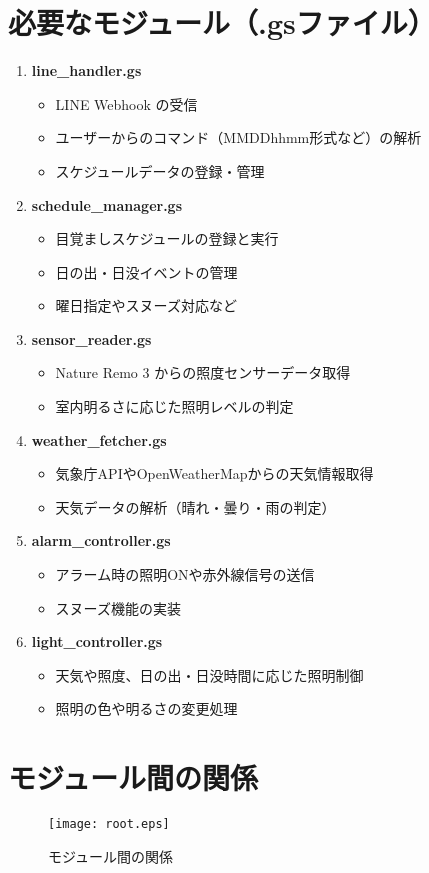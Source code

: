 \documentclass{jarticle}
\begin{document}
\section*{必要なモジュール（.gsファイル）}

\begin{enumerate}
  \item \textbf{line\_handler.gs}
  \begin{itemize}
    \item LINE Webhook の受信
    \item ユーザーからのコマンド（MMDDhhmm形式など）の解析
    \item スケジュールデータの登録・管理
  \end{itemize}

  \item \textbf{schedule\_manager.gs}
  \begin{itemize}
    \item 目覚ましスケジュールの登録と実行
    \item 日の出・日没イベントの管理
    \item 曜日指定やスヌーズ対応など
  \end{itemize}

  \item \textbf{sensor\_reader.gs}
  \begin{itemize}
    \item Nature Remo 3 からの照度センサーデータ取得
    \item 室内明るさに応じた照明レベルの判定
  \end{itemize}

  \item \textbf{weather\_fetcher.gs}
  \begin{itemize}
    \item 気象庁APIやOpenWeatherMapからの天気情報取得
    \item 天気データの解析（晴れ・曇り・雨の判定）
  \end{itemize}

  \item \textbf{alarm\_controller.gs}
  \begin{itemize}
    \item アラーム時の照明ONや赤外線信号の送信
    \item スヌーズ機能の実装
  \end{itemize}

  \item \textbf{light\_controller.gs}
  \begin{itemize}
    \item 天気や照度、日の出・日没時間に応じた照明制御
    \item 照明の色や明るさの変更処理
  \end{itemize}
\end{enumerate}

\section*{モジュール間の関係}

\begin{figure}[H]  %
  \begin{center}
    \texttt{[image: root.eps]}
    \caption{モジュール間の関係}
    \label{fig:root}
  \end{center}
\end{figure}
\end{document}
